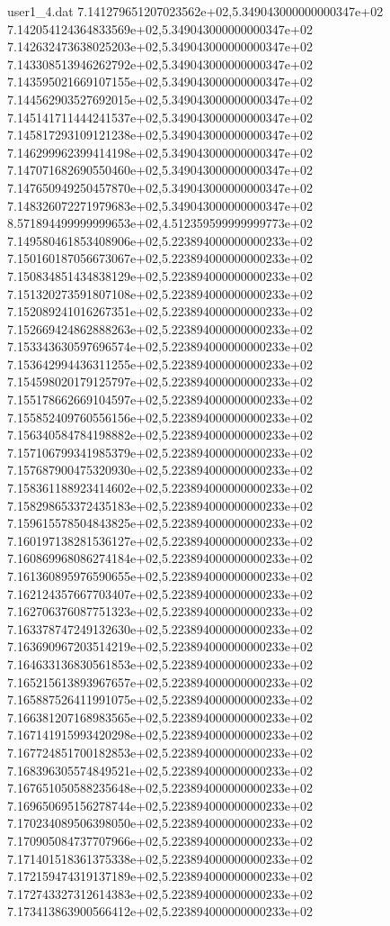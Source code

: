 \begin{filecontents}{user1_4.dat}
7.141279651207023562e+02,5.349043000000000347e+02
7.142054124364833569e+02,5.349043000000000347e+02
7.142632473638025203e+02,5.349043000000000347e+02
7.143308513946262792e+02,5.349043000000000347e+02
7.143595021669107155e+02,5.349043000000000347e+02
7.144562903527692015e+02,5.349043000000000347e+02
7.145141711444241537e+02,5.349043000000000347e+02
7.145817293109121238e+02,5.349043000000000347e+02
7.146299962399414198e+02,5.349043000000000347e+02
7.147071682690550460e+02,5.349043000000000347e+02
7.147650949250457870e+02,5.349043000000000347e+02
7.148326072271979683e+02,5.349043000000000347e+02
8.571894499999999653e+02,4.512359599999999773e+02
7.149580461853408906e+02,5.223894000000000233e+02
7.150160187056673067e+02,5.223894000000000233e+02
7.150834851434838129e+02,5.223894000000000233e+02
7.151320273591807108e+02,5.223894000000000233e+02
7.152089241016267351e+02,5.223894000000000233e+02
7.152669424862888263e+02,5.223894000000000233e+02
7.153343630597696574e+02,5.223894000000000233e+02
7.153642994436311255e+02,5.223894000000000233e+02
7.154598020179125797e+02,5.223894000000000233e+02
7.155178662669104597e+02,5.223894000000000233e+02
7.155852409760556156e+02,5.223894000000000233e+02
7.156340584784198882e+02,5.223894000000000233e+02
7.157106799341985379e+02,5.223894000000000233e+02
7.157687900475320930e+02,5.223894000000000233e+02
7.158361188923414602e+02,5.223894000000000233e+02
7.158298653372435183e+02,5.223894000000000233e+02
7.159615578504843825e+02,5.223894000000000233e+02
7.160197138281536127e+02,5.223894000000000233e+02
7.160869968086274184e+02,5.223894000000000233e+02
7.161360895976590655e+02,5.223894000000000233e+02
7.162124357667703407e+02,5.223894000000000233e+02
7.162706376087751323e+02,5.223894000000000233e+02
7.163378747249132630e+02,5.223894000000000233e+02
7.163690967203514219e+02,5.223894000000000233e+02
7.164633136830561853e+02,5.223894000000000233e+02
7.165215613893967657e+02,5.223894000000000233e+02
7.165887526411991075e+02,5.223894000000000233e+02
7.166381207168983565e+02,5.223894000000000233e+02
7.167141915993420298e+02,5.223894000000000233e+02
7.167724851700182853e+02,5.223894000000000233e+02
7.168396305574849521e+02,5.223894000000000233e+02
7.167651050588235648e+02,5.223894000000000233e+02
7.169650695156278744e+02,5.223894000000000233e+02
7.170234089506398050e+02,5.223894000000000233e+02
7.170905084737707966e+02,5.223894000000000233e+02
7.171401518361375338e+02,5.223894000000000233e+02
7.172159474319137189e+02,5.223894000000000233e+02
7.172743327312614383e+02,5.223894000000000233e+02
7.173413863900566412e+02,5.223894000000000233e+02

\end{filecontents}
